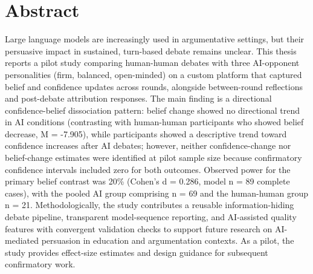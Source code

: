 \chapter*{Abstract}

Large language models are increasingly used in argumentative settings, but their
persuasive impact in sustained, turn-based debate remains unclear. This thesis reports
a pilot study comparing human-human debates with three AI-opponent personalities
(firm, balanced, open-minded) on a custom platform that captured belief and confidence
updates across rounds, alongside between-round reflections and post-debate attribution
responses. The main finding is a directional confidence-belief dissociation pattern:
belief change showed no directional trend in AI conditions (contrasting with human-human
participants who showed belief decrease, M = -7.905), while participants showed a descriptive
trend toward confidence increases after AI debates; however, neither confidence-change nor
belief-change estimates were identified at pilot sample size because confirmatory confidence
intervals included zero for both outcomes.
Observed power for the primary belief contrast was 20\% (Cohen's d = 0.286, model n = 89 complete cases),
with the pooled AI group comprising n = 69 and the human-human group n = 21.
Methodologically,
the study contributes a reusable information-hiding debate pipeline, transparent
model-sequence reporting, and AI-assisted quality features with convergent validation checks to support future
research on AI-mediated persuasion in education and argumentation contexts. As a pilot,
the study provides effect-size estimates and design guidance for subsequent confirmatory work.